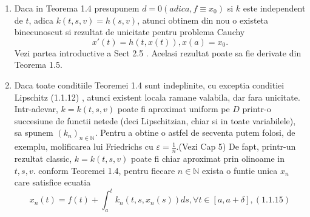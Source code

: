 \documentclass[a4paper,12pt,oneside]{report}
\begin{document}
	\begin{enumerate}[1.]
		\item Daca in Teorema 1.4 presupunem \(d = 0 ( adica, f \equiv x_{0} )\) si \(k\) este independent de \(t\), adica \(k\left ( t,s,v \right ) = h \left ( s,v \right )\), atunci obtinem din nou o existeta binecunoscut si rezultat de unicitate pentru problema Cauchy 
		      \begin{displaymath}
		      	{x}'\left ( t \right ) = h\left ( t,x\left ( t \right ) \right ), x\left ( a \right ) = x_{0}.
		      \end{displaymath}
		      Vezi partea introductive a Sect 2.5 . Acelasi rezultat poate sa fie derivate din Teorema 1.5. 
		\item Daca toate conditiile Teoremei 1.4 sunt indeplinite, cu exceptia conditiei Lipschitz (1.1.12) , atunci existent locala ramane valabila, dar fara unicitate. Intr-adevar, \(k = k\left ( t,s,v \right )\) poate fi aproximat uniform pe \(D\) printr-o succesiune de functii netede (deci Lipschitzian, chiar si in toate variabilele), sa spunem \(\left ( k_{n} \right )_{n\in \mathbb{N}}\). Pentru a obtine o astfel de secventa putem folosi, de exemplu, molificarea lui Friedrichs cu \(\varepsilon = \frac{1}{n}\).(Vezi Cap 5)  De fapt, printr-un rezultat classic, \(k = k\left ( t,s,v \right )\) poate fi chiar aproximat prin olinoame in \(t,s,v\). conform Teoremei 1.4, pentru fiecare \(n \in \mathbb{N}\) exista o funtie unica \(x_{n}\) care satisfice ecuatia
		      \begin{displaymath}
		      	x_{n}\left ( t \right ) = f\left ( t \right ) + \int_{a}^{t}k_{n}\left ( t,s,x_{n}\left ( s \right ) \right )ds, \forall t\in \left [ a,a+\delta  \right ], (1.1.15)
		      \end{displaymath}
		      		      		      		      		      

\end{enumerate}
\end{document}
